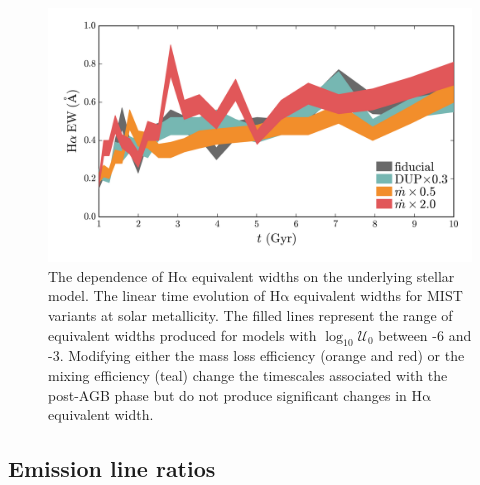 \documentclass[preprint2]{aastex62}
\newcommand{\ha}{\ensuremath{\mathrm{H\alpha}}\xspace}
\newcommand{\logten}{\ensuremath{\log_{10}}}
\newcommand{\logU}{\ensuremath{\logten \mathcal{U}_0}}
\begin{document}



\begin{figure}
  \begin{center}
    \includegraphics[width=\textwidth]{figs/f7.png}
    \caption{{\sc The dependence of \ha equivalent widths on the underlying stellar model.} The linear time evolution of \ha equivalent widths for MIST variants at solar metallicity. The filled lines represent the range of equivalent widths produced for models with \logU{} between -6 and -3. Modifying either the mass loss efficiency (orange and red) or the mixing efficiency (teal) change the timescales associated with the post-AGB phase but do not produce significant changes in \ha equivalent width.}
    \label{fig:EWvar}
  \end{center}
\end{figure}



\subsection{Emission line ratios} \label{sec:stars:ratios}
\end{document}
